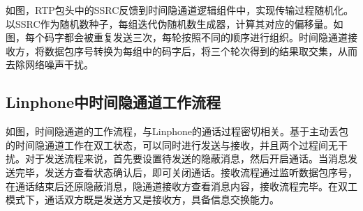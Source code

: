 
如图，RTP包头中的SSRC反馈到时间隐通道逻辑组件中，实现传输过程随机化。以SSRC作为随机数种子，每组迭代伪随机数生成器，计算其对应的偏移量。如图，每个码字都会被重复发送三次，每轮按照不同的顺序进行组织。时间隐通道接收方，将数据包序号转换为每组中的码字后，将三个轮次得到的结果取交集，从而去除网络噪声干扰。

\subsection{Linphone中时间隐通道工作流程}
\label{chap:linphone:designation:workflow}


如图，时间隐通道的工作流程，与Linphone的通话过程密切相关。基于主动丢包的时间隐通道工作在双工状态，可以同时进行发送与接收，并且两个过程间无干扰。对于发送流程来说，首先要设置待发送的隐蔽消息，然后开启通话。当消息发送完毕，发送方查看状态确认后，即可关闭通话。接收流程通过监听数据包序号，在通话结束后还原隐蔽消息，隐通道接收方查看消息内容，接收流程完毕。在双工模式下，通话双方既是发送方又是接收方，具备信息交换能力。